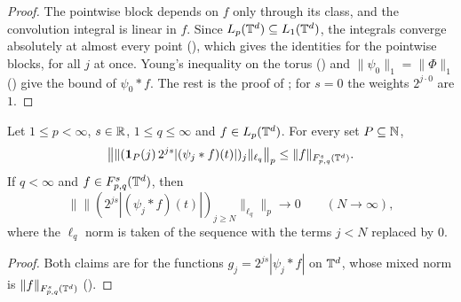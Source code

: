 \begin{proof}
\leanok
The pointwise block depends on $f$ only through its class, and the convolution integral is
linear in $f$. Since $L_p(\mathbb{T}^d) \subseteq L_1(\mathbb{T}^d)$, the integrals converge absolutely at almost
every point (), which gives the identities for the pointwise blocks,
for all $j$ at once. Young's inequality on the torus () and
$\|\psi_0\|_1 = \|\Phi\|_1$ () give the bound of $\psi_0 * f$. The rest
is the proof of ; for $s = 0$ the weights
$2^{j \cdot 0}$ are $1$.
\end{proof}

\begin{lemma}
\label{lem:torus-weighted-block-tails}
\leanok
{}
Let $1 \leq p < \infty$, $s \in \mathbb{R}$, $1 \leq q \leq \infty$ and $f \in L_p(\mathbb{T}^d)$. For every set
$P \subseteq \mathbb{N}$,
\[
  \bigl\| \|(\mathbf 1_P(j) \, 2^{js} |(\psi_j * f)(t)|)_j\|_{\ell_q} \bigr\|_p
  \leq \|f\|_{F^{s}_{p,q}(\mathbb{T}^d)} .
\]
If $q < \infty$ and $f \in F^{s}_{p,q}(\mathbb{T}^d)$, then
\[
  \bigl\| \|(2^{js} |(\psi_j * f)(t)|)_{j \geq N}\|_{\ell_q} \bigr\|_p \to 0 \qquad
  (N \to \infty) ,
\]
where the $\ell_q$ norm is taken of the sequence with the terms $j < N$ replaced by $0$.
\end{lemma}

\begin{proof}
\leanok
Both claims are  for the functions
$g_j = 2^{js} |\psi_j * f|$ on $\mathbb{T}^d$, whose mixed norm is $\|f\|_{F^{s}_{p,q}(\mathbb{T}^d)}$
().
\end{proof}

